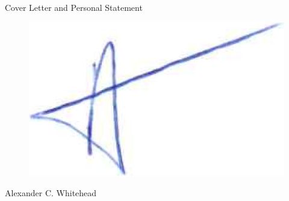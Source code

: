 \documentclass{cv}
\begin{document}
\begin{spacing}{1.8}
\begin{rSection}{Cover Letter and Personal Statement}
\begin{spacing}{1.0}
\begin{rSubsection}{}{}{}{}
                    \item \begin{figure} [H]
                              \vspace{-0.2cm}
                              \hspace{1.0cm}\includegraphics[width=0.3\linewidth]{signature.png}
                              \vspace{-1.3cm}
                          \end{figure}
                    
                    \item Alexander C. Whitehead
                \end{rSubsection}
            \end{spacing}
        \end{rSection}
    \end{spacing}

    \newpage
\end{document}
